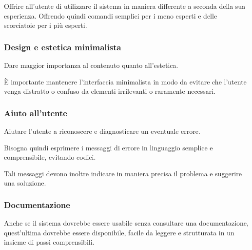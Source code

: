 Offrire all'utente di utilizzare il sistema in maniera differente a seconda della sua esperienza. Offrendo quindi comandi semplici per i meno esperti e delle scorciatoie per i più esperti.

\hypertarget{design-e-estetica-minimalista}{%
\subsubsection{Design e estetica minimalista}\label{design-e-estetica-minimalista}}

Dare maggior importanza al contenuto quanto all'estetica.

È importante mantenere l'interfaccia minimalista in modo da evitare che l'utente venga distratto o confuso da elementi irrilevanti o raramente necessari.

\hypertarget{aiuto-allutente}{%
\subsubsection{Aiuto all'utente}\label{aiuto-allutente}}

Aiutare l'utente a riconoscere e diagnosticare un eventuale errore.

Bisogna quindi esprimere i messaggi di errore in linguaggio semplice e comprensibile, evitando codici.

Tali messaggi devono inoltre indicare in maniera precisa il problema e suggerire una soluzione.

\hypertarget{documentazione}{%
\subsubsection{Documentazione}\label{documentazione}}

Anche se il sistema dovrebbe essere usabile senza consultare una documentazione, quest'ultima dovrebbe essere disponibile, facile da leggere e strutturata in un insieme di passi comprensibili.

